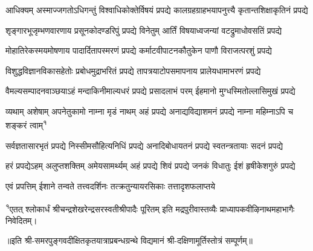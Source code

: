 

\twolineshloka
{आधिक्यम् अस्माज्जगतोऽधिगन्तुं विश्वाधिकोक्तेर्विषयं प्रपद्ये}
{कालग्रहग्राहभयापनुत्त्यै कृतान्तशिक्षाकृतिनं प्रपद्ये}

\twolineshloka
{शृङ्गारभूजृम्भणवारणाय प्रसूनकोदण्डरिपुं प्रपद्ये}
{विनेतुम् आर्तिं विषयाध्वजन्यां वटद्रुमाधोवसतिं प्रपद्ये}

\twolineshloka
{मोहातिरेकस्मयमोषणाय पादार्दितापस्मरणं प्रपद्ये}
{कर्माटवीपाटनकौतुकेन पाणौ विराजत्परशुं प्रपद्ये}

\twolineshloka
{विशुद्धविज्ञानविकासहेतोः प्रबोधमुद्राभरितं प्रपद्ये}
{तापत्रयाटोपसमापनाय प्रालेयधामाभरणं प्रपद्ये}

\twolineshloka
{वैमल्यसम्पादनवाञ्छयाऽहं मन्दाकिनीमाल्यधरं प्रपद्ये}
{प्रसादलाभं परम् ईहमानो मुग्धस्मितोल्लासिमुखं प्रपद्ये}

\twolineshloka
{व्यथाम् अशेषाम् अपनेतुकामो नाम्ना मृडं नाथम् अहं प्रपद्ये}
{अनाद्यविद्याशमनं प्रपद्ये नाम्ना महिम्नाऽपि च शङ्करं त्वाम्\textsuperscript{१}}

\twolineshloka
{सर्वज्ञतासारभृतं प्रपद्ये निस्सीमसौहित्यनिधिं प्रपद्ये}
{अनादिबोधायतनं प्रपद्ये स्वतन्त्रतायाः सदनं प्रपद्ये}

\twolineshloka
{हरं प्रपद्येऽहम् अलुप्तशक्तिम् अमेयसामर्थ्यम् अहं प्रपद्ये}
{शिवं प्रपद्ये जनकं विधातुः ईशं हृषीकेशगुरुं प्रपद्ये}

\twolineshloka
{एवं प्रपत्तिम् ईशाने तन्वते तत्त्वदर्शिनः}
{तत्क्रतुन्यायरसिकाः तत्तादृशफलाप्तये}

{\raggedright\fontsize{8}{9}\selectfont \textsuperscript{१}{एतत् श्लोकार्धं श्रीचन्द्रशेखरेन्द्रसरस्वतीश्रीपादैः पूरितम् इति मद्रपुरीवास्तव्यैः प्राध्यापकवीऴिनाथमहाभागैः निवेदितम्।}}


॥इति श्री-समरपुङ्गवदीक्षितकृतयात्राप्रबन्धग्रन्थे विद्यमानं श्री-दक्षिणामूर्तिस्तोत्रं सम्पूर्णम्॥
